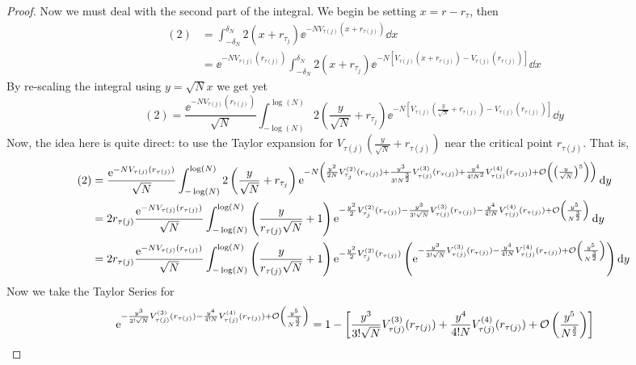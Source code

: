 \begin{proof}
Now we must deal with the second part of the integral. We begin be setting $x = r - r_\tau$, then
\begin{align}
	(2) & = \int_{-\delta_N}^{\delta_N} 2 (x + r_{\tau_j}) \ee^{-N V_{\tau(j)}(x + r_{\tau(j)})} \dd x \\
	& = \ee^{-N V_{\tau(j)}(r_{\tau(j)})}  \int_{-\delta_N}^{\delta_N} 2 (x + r_{\tau_j}) \ee^{-N \left[ V_{\tau(j)}(x + r_{\tau(j)}) - V_{\tau(j)}(r_{\tau(j)})\right]} \dd x
\end{align}
By re-scaling the integral using $y = \sqrt{N} x$ we get yet
\begin{equation}
	(2) = \frac{\ee^{-N V_{\tau(j)}(r_{\tau(j)})}}{\sqrt{N}}  \int_{-\log(N)}^{\log(N)} 2 \left(\frac{y}{\sqrt{N}} + r_{\tau_j} \right) \ee^{-N \left[ V_{\tau(j)}(\frac{y}{\sqrt{N}} + r_{\tau(j)}) - V_{\tau(j)}(r_{\tau(j)})\right]} \dd y
\end{equation}
Now, the idea here is quite direct: to use the Taylor expansion for $V_{\tau(j)}\left(\frac{y}{\sqrt{N}} + r_{\tau(j)}\right )$ near the critical point $r_{\tau(j)}$. That is,  
\begin{align}
	(2) & =\frac{\operatorname{e}^{-N V_{\tau(j)}(r_{\tau(j)})}}{\sqrt{N}}  \int_{-\log(N)}^{\log(N)} 2 \left(\frac{y}{\sqrt{N}} + r_{\tau_j} \right) \operatorname{e}^{-N \left(\frac{y^2}{2N} V^{(2)}_{\tau_j}(r_{\tau(j)}) + \frac{y^3}{3! N^{\frac{3}{2}}} V^{(3)}_{\tau(j)}(r_{\tau(j)}) + \frac{y^4}{4! N^2} V^{(4)}_{\tau(j)}(r_{\tau(j)})+ \mathcal{O}\left(\left(\frac{y}{\sqrt{N}}\right)^5\right) \right)} \mathrm{d} y \\
	& = 2 r_{\tau(j)} \frac{\operatorname{e}^{-N V_{\tau(j)}(r_{\tau(j)})}}{\sqrt{N}}  \int_{-\log(N)}^{\log(N)} \left(\frac{y}{r_{\tau(j)}\sqrt{N}} + 1 \right) \operatorname{e}^{-\frac{y^2}{2} V^{(2)}_{\tau_j}(r_{\tau(j)}) - \frac{y^3}{3! \sqrt{N}} V^{(3)}_{\tau(j)}(r_{\tau(j)}) - \frac{y^4}{4! N} V^{(4)}_{\tau(j)}(r_{\tau(j)}) + \mathcal{O}\left(\frac{y^5}{N^\frac{3}{2}}\right)} \mathrm{d} y \\
	& = 2 r_{\tau(j)} \frac{\operatorname{e}^{-N V_{\tau(j)}(r_{\tau(j)})}}{\sqrt{N}}  \int_{-\log(N)}^{\log(N)} \left(\frac{y}{r_{\tau(j)}\sqrt{N}} + 1 \right) \operatorname{e}^{-\frac{y^2}{2} V^{(2)}_{\tau_j}(r_{\tau(j)})} \left(\operatorname{e}^{- \frac{y^3}{3! \sqrt{N}} V^{(3)}_{\tau(j)}(r_{\tau(j)}) - \frac{y^4}{4! N} V^{(4)}_{\tau(j)}(r_{\tau(j)}) + \mathcal{O}\left(\frac{y^5}{N^\frac{3}{2}}\right)}\right) \mathrm{d} y
\end{align}
Now we take the Taylor Series for 
\begin{align}
	& \ee^{- \frac{y^3}{3! \sqrt{N}} V^{(3)}_{\tau(j)}(r_{\tau(j)}) - \frac{y^4}{4! N} V^{(4)}_{\tau(j)}(r_{\tau(j)}) + \Boh\left(\frac{y^5}{N^\frac{3}{2}}\right)} = 1 - \left[ \frac{y^3}{3! \sqrt{N}} V^{(3)}_{\tau(j)}(r_{\tau(j)}) + \frac{y^4}{4! N} V^{(4)}_{\tau(j)}(r_{\tau(j)}) + \Boh\left(\frac{y^5}{N^\frac{3}{2}}\right) \right]  \\ 

\end{align}
\end{proof}
